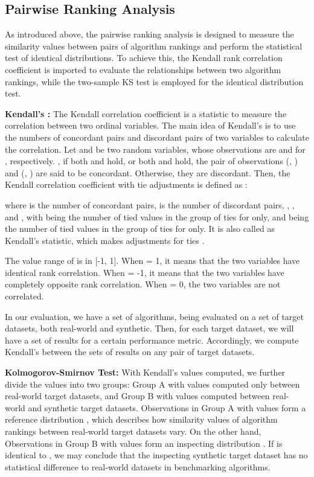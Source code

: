 \documentclass[10pt,twocolumn,letterpaper]{article}
\begin{document}
\subsection{Pairwise Ranking Analysis}

As introduced above, the pairwise ranking analysis is designed to measure the similarity values between pairs of algorithm rankings and perform the statistical test of identical distributions. To achieve this, the Kendall rank correlation coefficient is imported to evaluate the relationships between two algorithm rankings, while the two-sample KS test is employed for the identical distribution test.

\textbf{Kendall's :} The Kendall correlation coefficient  is a statistic to measure the correlation between two ordinal variables. The main idea of Kendall's  is to use the numbers of concordant pairs and discordant pairs of two variables to calculate the correlation. Let  and  be two random variables, whose observations are  and  for , respectively. , if both  and  hold, or both  and  hold, the pair of observations (, ) and (, ) are said to be concordant. Otherwise, they are discordant. Then, the Kendall correlation coefficient with tie adjustments is defined as \cite{kendall1945}:

where  is the number of concordant pairs,  is the number of discordant pairs, , , and , with  being the number of tied values in the  group of ties for  only, and  being the number of tied values in the  group of ties for  only. It is also called as Kendall's  statistic, which makes adjustments for ties \cite{kendall1945}.

The value range of  is in [-1, 1]. When  = 1, it means that the two variables have identical rank correlation. When  = -1, it means that the two variables have completely opposite rank correlation. When  = 0, the two variables are not correlated.

In our evaluation, we have a set of  algorithms, being evaluated on a set of target datasets, both real-world and synthetic. Then, for each target dataset, we will have a set of  results for a certain performance metric. Accordingly, we compute Kendall's  between the sets of  results on any pair of target datasets.

\textbf{Kolmogorov-Smirnov Test:} With Kendall's  values computed, we further divide the values into two groups: Group A with  values computed only between real-world target datasets, and Group B with  values computed between real-world and synthetic target datasets. Observations in Group A with  values form a reference distribution , which describes how similarity values of algorithm rankings between real-world target datasets vary. On the other hand, Observations in Group B with  values form an inspecting distribution . If  is identical to , we may conclude that the inspecting synthetic target dataset has no statistical difference to real-world datasets in benchmarking algorithms.
\end{document}
